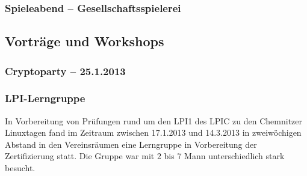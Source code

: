 \documentclass[10pt,DIV16]{scrartcl}
\begin{document}
\subsubsection{Spieleabend -- Gesellschaftsspielerei}
\subsection{Vorträge und Workshops}

\subsubsection{Cryptoparty -- 25.1.2013}

\subsubsection{LPI-Lerngruppe}

In Vorbereitung von Prüfungen rund um den LPI1 des LPIC zu den
Chemnitzer Linuxtagen fand im Zeitraum zwischen 17.1.2013 und
14.3.2013 in zweiwöchigen Abstand in den Vereinsräumen eine
Lerngruppe in Vorbereitung der Zertifizierung statt. Die Gruppe war
mit 2 bis 7 Mann unterschiedlich stark besucht.
\end{document}
